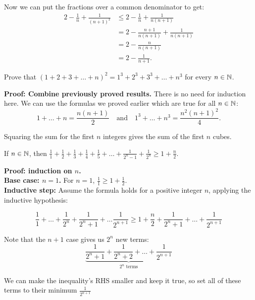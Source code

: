 \documentclass{article}
\begin{document}
Now we can put the fractions over a common denominator to get:
\begin{align*}
    2 - \frac{1}{n} + \frac{1}{(n+1)^2} & \leq 2 - \frac{1}{n} + \frac{1}{n(n+1)}     \\
                                        & = 2 - \frac{n+1}{n(n+1)} + \frac{1}{n(n+1)} \\
                                        & = 2 - \frac{n}{n(n+1)}                      \\
                                        & = 2 - \frac{1}{n+1}.
\end{align*}

\begin{problem}
Prove that $(1 + 2 + 3 + \ldots + n)^2 = 1^3 + 2^3 + 3^3 + \ldots + n^3$ for every $n \in \mathbb{N}$.
\end{problem}

\textbf{Proof: Combine previously proved results.} There is no need for induction here. We can use the formulas we proved earlier which are true for all $n \in \mathbb{N}$:
\\

$$1 + \ldots + n = \frac{n(n+1)}{2} \quad \text{and} \quad 1^3 + \ldots + n^3 = \frac{n^2(n+1)^2}{4}.$$

Squaring the sum for the first $n$ integers gives the sum of the first $n$ cubes.

\begin{problem}
If $n \in \mathbb{N}$, then $\frac{1}{1} + \frac{1}{2} + \frac{1}{3} + \frac{1}{4} + \frac{1}{5} + \ldots + \frac{1}{2^n - 1} + \frac{1}{2^n} \geq 1 + \frac{n}{2}$.
\end{problem}

\textbf{Proof: induction on $n$.}
\\

\textbf{Base case: $n = 1$.} For $n = 1$, $\frac{1}{1} \geq 1 + \frac{1}{2}$.
\\

\textbf{Inductive step:} Assume the formula holds for a positive integer $n$, applying the inductive hypothesis:

$$\frac{1}{1} + \ldots + \frac{1}{2^n} + \frac{1}{2^n + 1} + \ldots \frac{1}{2^{n+1}} \geq 1 + \frac{n}{2} + \frac{1}{2^n + 1} + \ldots + \frac{1}{2^{n+1}}$$

Note that the $n+1$ case gives us $2^n$ new terms:
$$\underbrace{\frac{1}{2^n + 1} + \frac{1}{2^n + 2} + \ldots + \frac{1}{2^{n+1}}}_\text{$2^n$ terms}$$

We can make the inequality's RHS smaller and keep it true, so set all of these terms to their minimum $\frac{1}{2^{n+1}}$
\end{document}
